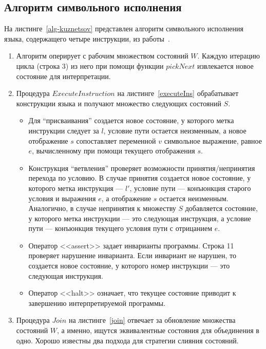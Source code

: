 \subsection{Алгоритм символьного исполнения}
На листинге~\ref{alg-kuznetsov} представлен алгоритм символьного исполнения языка, содержащего четыре инструкции, из работы~\cite{kuznetsov2012efficient}.
\begin{enumerate}
    \item Алгоритм оперирует с рабочим множеством состояний $W$. Каждую итерацию цикла (строка 3) из него при помощи функции $pickNext$ извлекается новое состояние для интерпретации.
    \item Процедура $ExecuteInstruction$ на листинге~\ref{executeIns} обрабатывает конструкции языка и получают множество следующих состояний $S$.
        \begin{itemize}
            \item Для ``присваивания'' создается новое состояние, у которого метка инструкции следует за $l$, условие пути остается неизменным, а новое отображение $s$ 
            сопоставляет переменной $v$ символьное выражение, равное $e$, вычисленному при помощи текущего отображения $s$.
            \item Конструкция ``ветвления'' проверяет возможности принятия/непринятия перехода по условию. В случае принятия создается новое состояние, у которого метка инструкция --- $l'$, условие пути --- конъюнкция старого условия и выражения $e$, а отображение $s$ остается неизменным. Аналогично, в случае непринятия к множеству $S$ добавляется состояние, у которого метка инструкции --- это следующая инструкция, а условие пути --- конъюнкция текущего условия пути с отрицанием $e$.
            \item Оператор <<assert>> задает инварианты программы. Строка 11 проверяет нарушение инварианта. Если инвариант не нарушен, то создается новое состояние, у которого номер инструкции --- это следующая инструкция.
            \item Оператор <<halt>> означает, что текущее состояние приводит к завершению интерпретируемой программы.
        \end{itemize}
    \item Процедура $Join$ на листинге~\ref{join} отвечает за обновление множества состояний $W$, а именно, ищутся эквивалентные состояния для объединения в одно. Хорошо известны два подхода для стратегии слияния состояний. 

\end{enumerate}
